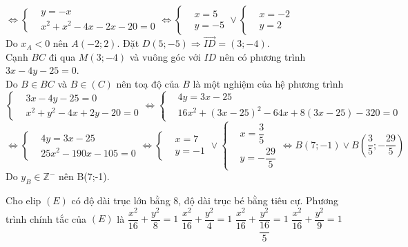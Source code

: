 \begin{ex}
{		   $\Leftrightarrow \left \{\begin{aligned}
		   &y=-x \\
		   &x^2+x^2-4x-2x-20=0
		   \end{aligned} \right.\Leftrightarrow \left \{\begin{aligned}
			&x=5 \\
			&y=-5
		\end{aligned} \right. \vee \left \{\begin{aligned}
			&x=-2 \\
			&y=2
		\end{aligned} \right.$\\
		Do $x_A<0$ nên $A(-2;2)$. Đặt $D(5;-5) \Rightarrow \overrightarrow{ID}=(3;-4)$.\\
		Cạnh $BC$ đi qua $M(3;-4)$ và vuông góc với $ID$ nên có phương trình $3x-4y-25=0$.\\
		Do $B \in BC$ và $B \in (C)$ nên toạ độ của $B$ là một nghiệm của hệ phương trình \\
		$ \left \{\begin{aligned}
		&3x-4y-25=0 \\
		&x^2+y^2-4x+2y-20=0
		\end{aligned} \right. \Leftrightarrow \left \{\begin{aligned}
		&4y=3x-25 \\
		&16x^2+(3x-25)^2-64x+8(3x-25)-320=0
		\end{aligned} \right.$\\
		$ \Leftrightarrow \left\{\begin{aligned}
		&4y=3x-25 \\
		&25x^2-190x-105=0
		\end{aligned}\right. \Leftrightarrow \left\{\begin{aligned}
		&x=7 \\
		&y=-1
		\end{aligned}\right. \vee \left\{\begin{aligned}
		&x=\dfrac{3}{5} \\
		&y=-\dfrac{29}{5}
		\end{aligned}\right. \Leftrightarrow B(7;-1) \vee B\left(\dfrac{3}{5};-\dfrac{29}{5}\right)$\\
		Do $y_B \in \mathbb{Z^-}$ nên B(7;-1).
	}
\end{ex}
\begin{ex}%
	Cho elip $(E)$ có độ dài trục lớn bằng $8$, độ dài trục bé bằng tiêu cự. Phương trình chính tắc của $(E)$ là
	\choice
	{\True $ \dfrac{x^2}{16}+ \dfrac{y^2}{8}=1$}
	{$ \dfrac{x^2}{16}+ \dfrac{y^2}{4}=1$}
	{$ \dfrac{x^2}{16}+ \dfrac{y^2}{\dfrac{16}{5}}=1$}
	{$ \dfrac{x^2}{16}+ \dfrac{y^2}{9}=1$}
\end{ex}
